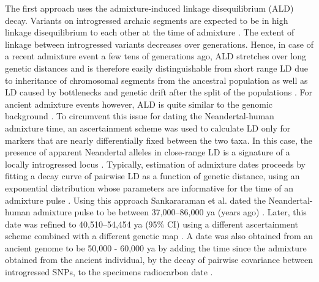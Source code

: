\documentclass[]{article}
\begin{document}
The first approach uses the admixture-induced linkage disequilibrium (ALD) decay. Variants on introgressed archaic segments are expected to be in high linkage disequilibrium to each other at the time of admixture \citep{chakraborty_admixture_1988,stephens_mapping_1994,wall_detecting_2000}. The extent of linkage between introgressed variants decreases over generations. Hence, in case of a recent admixture event a few tens of generations ago, ALD stretches  over long genetic distances
\citep{patterson_methods_2004} and is therefore easily distinguishable from short range LD due to inheritance of chromosomal segments from the ancestral population as well as LD caused by bottlenecks and genetic drift after the split of the populations \citep{moorjani_history_2011,sankararaman_date_2012}. For ancient admixture events however, ALD is quite similar to the genomic background \citep{sankararaman_date_2012}. To circumvent this issue for dating the Neandertal-human admixture time, an ascertainment scheme was used to calculate LD only for markers that are nearly differentially fixed between the two taxa. In this case, the presence of apparent Neandertal alleles in close-range LD is a signature of a locally introgressed locus
\citep{sankararaman_date_2012}. Typically, estimation of admixture dates proceeds by fitting a decay curve of pairwise LD as a function of genetic distance, using an exponential distribution whose parameters are informative for the time of an admixture pulse \citep{moorjani_history_2011,loh_inferring_2013}. Using this approach Sankararaman et al. dated the Neandertal-human admixture pulse to be  between 37,000--86,000 ya (years ago) \citep{sankararaman_date_2012}. Later, this date was refined to 40,510--54,454 ya (95\% CI) using a different ascertainment scheme combined with a different genetic map \citep{moorjani_genetic_2016}. A date was also obtained from an ancient genome to be 50,000 - 60,000 ya by adding the time since the admixture obtained from the ancient individual, by the decay of pairwise covariance between
introgressed SNPs, to the specimens radiocarbon date \citep{fu_genome_2014}.
\end{document}

